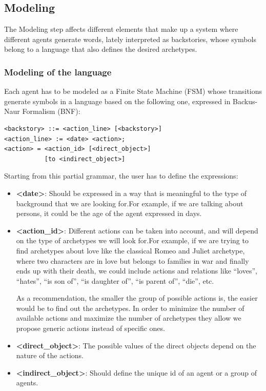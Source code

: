 \documentclass{sig-alternate}
\begin{document}
\subsection{Modeling}

The Modeling step affects different elements that make up a system where different agents generate words, lately interpreted as backstories, whose symbols belong to a language that also defines the desired archetypes.


\subsubsection{Modeling of the language}

Each agent has to be modeled as a Finite State Machine (FSM) whose transitions generate symbols in a language based on the following one, expressed in Backus-Naur Formalism (BNF):

\begin{verbatim}
<backstory> ::= <action_line> [<backstory>]
<action_line> := <date> <action>;
<action> = <action_id> [<direct_object>]
           [to <indirect_object>]
\end{verbatim}

Starting from this partial grammar, the user has to define the expressions:
\begin{itemize}
\item \textbf{<date>}: Should be expressed in a way that is meaningful to the type of background that we are looking for.For example, if we are talking about persons, it could be the age of the agent expressed in days.

\item \textbf{<action\_id>}: Different actions can be taken into account, and will depend on the type of archetypes we will look for.For example, if we are trying to find archetypes about love like the classical Romeo and Juliet archetype, where two characters are in love but belongs to families in war and finally ends up with their death, we could include actions and relations like ``loves'', ``hates'', ``is son of'', ``is daughter of'', ``is parent of'', ``die'', etc.

As a recommendation, the smaller the group of possible actions is, the easier would be to find out the archetypes. In order to minimize the number of available actions and maximize the number of archetypes they allow we propose generic actions instead of specific ones.

\item \textbf{<direct\_object>}: The possible values of the direct objects depend on the nature of the actions.

\item \textbf{<indirect\_object>}: Should define the unique id of an agent or a group of agents.

\end{itemize}
\end{document}
